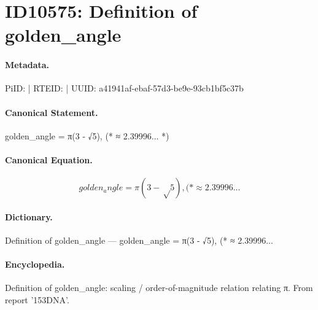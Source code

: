 \section*{ID10575: Definition of golden\_angle}
\paragraph{Metadata.}
PiID:  | RTEID:  | UUID: a41941af-ebaf-57d3-be9e-93cb1bf5c37b

\paragraph{Canonical Statement.}
golden\_angle = π(3 - √5), (* ≈ 2.39996... *)

\paragraph{Canonical Equation.}
\[
golden_angle = π(3 - √5), (* ≈ 2.39996...
\]

\paragraph{Dictionary.}
Definition of golden\_angle — golden\_angle = π(3 - √5), (* ≈ 2.39996...

\paragraph{Encyclopedia.}
Definition of golden\_angle: scaling / order-of-magnitude relation relating π. From report '153DNA'.
